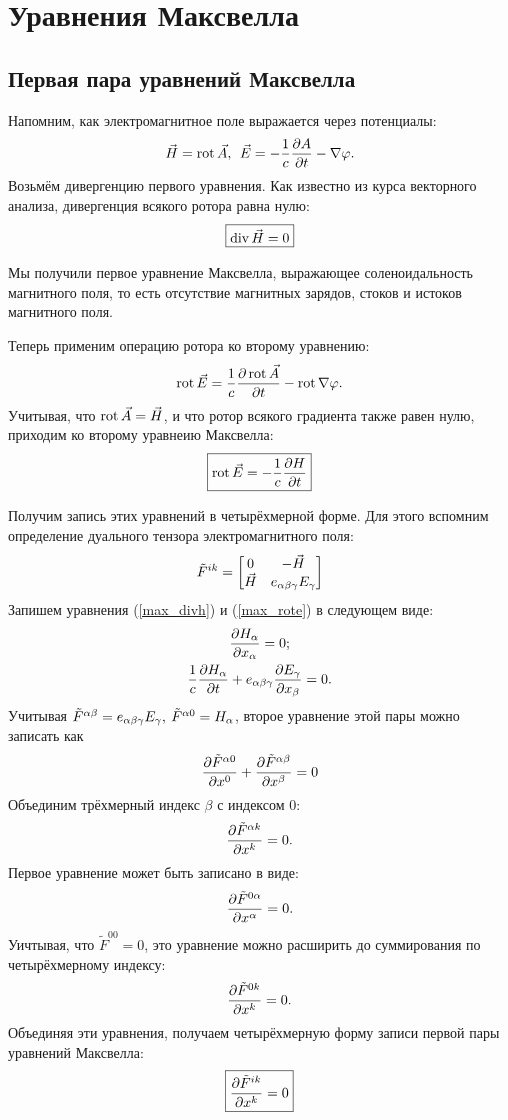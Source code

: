 \newpage
\section{Уравнения Максвелла}
\subsection{Первая пара уравнений Максвелла}
    Напомним, как электромагнитное поле выражается через потенциалы:
    \[
        \vec{H} = \operatorname{rot} \vec{A}, \:\: \vec{E} = - \frac1c\frac{\partial A}{\partial t} - \nabla\varphi.
    \]
    Возьмём дивергенцию первого уравнения. Как известно из курса векторного анализа, дивергенция всякого ротора равна нулю:
    \begin{equation}
        \boxed{\operatorname{div}\vec{H} = 0} \label{max_divh}
    \end{equation}
    
    Мы получили первое уравнение Максвелла, выражающее соленоидальность магнитного поля, то есть отсутствие магнитных зарядов, стоков и истоков магнитного поля.
    
    Теперь применим операцию ротора ко второму уравнению:
    \[
        \operatorname{rot} \vec{E} = \frac 1c \frac{\partial\operatorname{rot}\vec{A}}{\partial t} - \operatorname{rot}\nabla\varphi.
    \]
    Учитывая, что $\operatorname{rot}\vec{A} = \vec{H}$, и что ротор всякого градиента также равен нулю, приходим ко второму уравнеию Максвелла:
    \begin{equation}
        \boxed{\operatorname{rot}{\vec{E}} = -\frac 1c \frac{\partial H}{\partial t}} \label{max_rote}
    \end{equation}

    Получим запись этих уравнений в четырёхмерной форме. Для этого вспомним определение дуального тензора электромагнитного поля:
    \[
        \tilde{F}^{ik} = \begin{bmatrix}
            0 & -\vec{H} \\
            \vec{H} & e_{\alpha\beta\gamma} E_{\gamma}
        \end{bmatrix}
    \]
    Запишем уравнения (\ref{max_divh}) и (\ref{max_rote}) в следующем виде:
    \begin{gather*}
        \frac{\partial H_{\alpha}}{\partial x_{\alpha}} = 0; \\
        \frac 1c \frac{\partial H_{\alpha}}{\partial t} + e_{\alpha\beta\gamma} \frac{\partial E_{\gamma}}{\partial x_{\beta}} = 0.
    \end{gather*}
    Учитывая $\tilde{F}^{\alpha\beta} = e_{\alpha\beta\gamma} E_{\gamma}, \: \tilde{F}^{\alpha 0} = H_{\alpha}$, второе уравнение этой пары можно записать как
    \begin{gather*}
        \frac{\partial\tilde{F}^{\alpha 0}}{\partial x^0} + \frac{\partial\tilde{F}^{\alpha\beta}}{\partial x^\beta} = 0
    \end{gather*}
    Объединим трёхмерный индекс $\beta$ с индексом $0$:
    \[
        \frac{\partial\tilde{F}^{\alpha k}}{\partial x^k} = 0.
    \]
    Первое уравнение может быть записано в виде:
    \[
        \frac{\partial\tilde{F}^{0 \alpha}}{\partial x^{\alpha}} = 0.
    \]
    Уичтывая, что $\tilde{F}^{00} = 0$, это уравнение можно расширить до суммирования по четырёхмерному индексу:
    \[
        \frac{\partial\tilde{F}^{0k}}{\partial x^k} = 0.
    \]
    Объединяя эти уравнения, получаем четырёхмерную форму записи первой пары уравнений Максвелла:
    \[
        \boxed{\frac{\partial\tilde{F}^{ik}}{\partial x^k} = 0}
    \]


